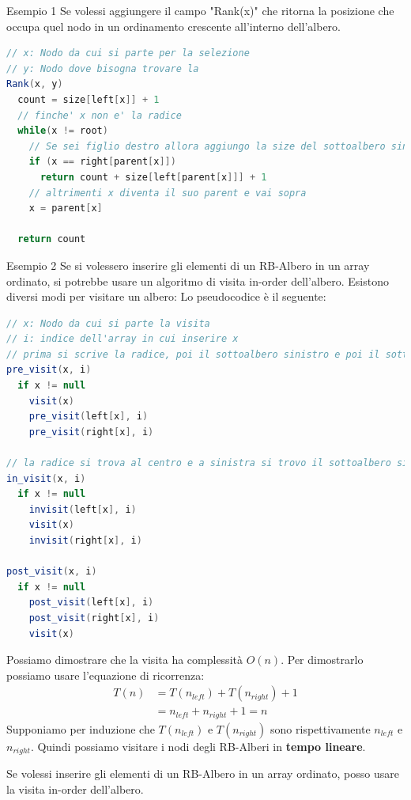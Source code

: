 \documentclass[a4paper]{article}
\begin{document}
\begin{examplebox}{Esempio 1}
  Se volessi aggiungere il campo "Rank(x)" che ritorna la posizione che occupa quel nodo in un ordinamento crescente all'interno dell'albero.
  \begin{lstlisting}[language=Scala]
// x: Nodo da cui si parte per la selezione
// y: Nodo dove bisogna trovare la 
Rank(x, y) 
  count = size[left[x]] + 1
  // finche' x non e' la radice
  while(x != root)
    // Se sei figlio destro allora aggiungo la size del sottoalbero sinistro e il padre
    if (x == right[parent[x]]) 
      return count + size[left[parent[x]]] + 1
    // altrimenti x diventa il suo parent e vai sopra
    x = parent[x]
  
  return count
\end{lstlisting}

\end{examplebox}
\begin{examplebox}{Esempio 2}
  Se si volessero inserire gli elementi di un RB-Albero in un array ordinato, si potrebbe usare un algoritmo di visita in-order dell'albero. 
  Esistono diversi modi per visitare un albero:
  Lo pseudocodice è il seguente:
  \begin{lstlisting}[language=Scala]
// x: Nodo da cui si parte la visita
// i: indice dell'array in cui inserire x
// prima si scrive la radice, poi il sottoalbero sinistro e poi il sottoalbero destro
pre_visit(x, i)
  if x != null
    visit(x)
    pre_visit(left[x], i)
    pre_visit(right[x], i)
  
// la radice si trova al centro e a sinistra si trovo il sottoalbero sinistro e a destra il sottoalbero destro
in_visit(x, i) 
  if x != null
    invisit(left[x], i)
    visit(x)
    invisit(right[x], i)

post_visit(x, i)
  if x != null
    post_visit(left[x], i)
    post_visit(right[x], i)
    visit(x)
  \end{lstlisting}
\noindent
Possiamo dimostrare che la visita ha complessità $O(n)$. Per dimostrarlo possiamo usare l'equazione di ricorrenza:
\begin{align*}
  T(n) &= T(n_{left}) + T(n_{right}) + 1\\
  &= n_{left} + n_{right} + 1 = n
\end{align*}
\noindent
Supponiamo per induzione che $T(n_{left})$ e $T(n_{right})$ sono rispettivamente $n_{left}$ e $n_{right}$.
Quindi possiamo visitare i nodi degli RB-Alberi in \textbf{tempo lineare}.
\end{examplebox}
Se volessi inserire gli elementi di un RB-Albero in un array ordinato, posso usare la visita in-order dell'albero. 
\end{document}
